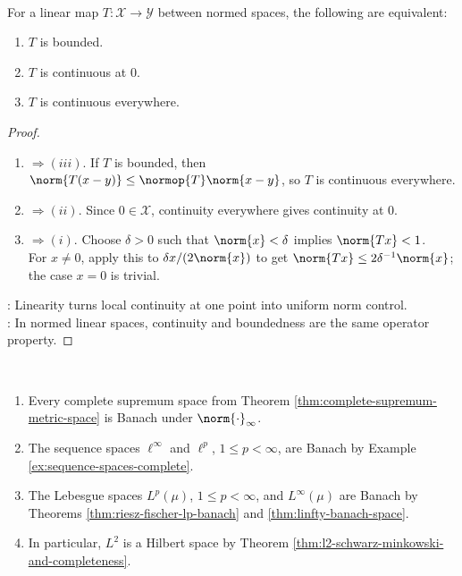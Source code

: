 \begin{theorem} \label{thm:bounded-linear-map-continuity-equivalences} \\
For a linear map $T:\mathcal{X}\to\mathcal{Y}$ between normed spaces, the following are equivalent:
\begin{enumerate}[label=(\roman*)]
\setlength{\itemsep}{0pt}
\item $T$ is bounded.
\item $T$ is continuous at $0$.
\item $T$ is continuous everywhere.
\end{enumerate}
\begin{proof}
\begin{enumerate}[label=(\roman*).]
\setlength{\itemsep}{0pt}
\item[$(i)$] $\Rightarrow (iii)$. If $T$ is bounded, then $\norm{T(x-y)}\leq\normop{T}\norm{x-y}$, so $T$ is continuous everywhere.
\item[$(iii)$] $\Rightarrow (ii)$. Since $0\in\mathcal{X}$, continuity everywhere gives continuity at $0$.
\item[$(ii)$] $\Rightarrow (i)$. Choose $\delta>0$ such that $\norm{x}<\delta$ implies $\norm{Tx}<1$.\\
For $x\neq0$, apply this to $\delta x/(2\norm{x})$ to get $\norm{Tx}\leq2\delta^{-1}\norm{x}$; the case $x=0$ is trivial.
\end{enumerate}
: Linearity turns local continuity at one point into uniform norm control.\\
: In normed linear spaces, continuity and boundedness are the same operator property.
\end{proof}
\end{theorem}

\begin{example} \label{ex:standard-banach-space-examples} \\
\begin{enumerate}[label=(\roman*)]
\setlength{\itemsep}{0pt}
\item Every complete supremum space from Theorem \ref{thm:complete-supremum-metric-space} is Banach under $\norm{\cdot}_{\infty}$.
\item The sequence spaces $\ell^\infty$ and $\ell^p$, $1\leq p<\infty$, are Banach by Example \ref{ex:sequence-spaces-complete}.
\item The Lebesgue spaces $L^p(\mu)$, $1\leq p<\infty$, and $L^\infty(\mu)$ are Banach by Theorems \ref{thm:riesz-fischer-lp-banach} and \ref{thm:linfty-banach-space}.
\item In particular, $L^2$ is a Hilbert space by Theorem \ref{thm:l2-schwarz-minkowski-and-completeness}.
\end{enumerate}
\end{example}

